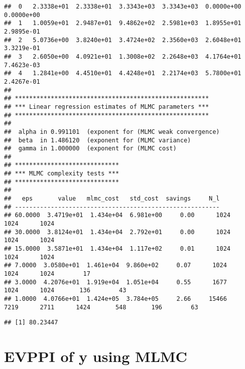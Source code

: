 \documentclass[
]{article}
\newenvironment{Shaded}{\begin{snugshade}}{\end{snugshade}}
\newcommand{\CommentTok}[1]{\textcolor[rgb]{0.56,0.35,0.01}{\textit{#1}}}
\newcommand{\DecValTok}[1]{\textcolor[rgb]{0.00,0.00,0.81}{#1}}
\newcommand{\KeywordTok}[1]{\textcolor[rgb]{0.13,0.29,0.53}{\textbf{#1}}}
\newcommand{\NormalTok}[1]{#1}
\newcommand{\OperatorTok}[1]{\textcolor[rgb]{0.81,0.36,0.00}{\textbf{#1}}}
\newcommand{\StringTok}[1]{\textcolor[rgb]{0.31,0.60,0.02}{#1}}
\begin{document}
\begin{verbatim}
##  0   2.3338e+01  2.3338e+01  3.3343e+03  3.3343e+03  0.0000e+00  0.0000e+00 
##  1   1.0059e+01  2.9487e+01  9.4862e+02  2.5981e+03  1.8955e+01  2.9895e-01 
##  2   5.0736e+00  3.8240e+01  3.4724e+02  2.3560e+03  2.6048e+01  3.3219e-01 
##  3   2.6050e+00  4.0921e+01  1.3008e+02  2.2648e+03  4.1764e+01  7.4623e-03 
##  4   1.2841e+00  4.4510e+01  4.4248e+01  2.2174e+03  5.7800e+01  2.4267e-01 
## 
## ******************************************************
## *** Linear regression estimates of MLMC parameters ***
## ******************************************************
## 
##  alpha in 0.991101  (exponent for (MLMC weak convergence)
##  beta  in 1.486120  (exponent for (MLMC variance) 
##  gamma in 1.000000  (exponent for (MLMC cost) 
## 
## ***************************** 
## *** MLMC complexity tests *** 
## ***************************** 
## 
##   eps       value   mlmc_cost   std_cost  savings     N_l 
## --------------------------------------------------------- 
## 60.0000  3.4719e+01  1.434e+04  6.981e+00     0.00      1024      1024      1024
## 30.0000  3.8124e+01  1.434e+04  2.792e+01     0.00      1024      1024      1024
## 15.0000  3.5871e+01  1.434e+04  1.117e+02     0.01      1024      1024      1024
## 7.0000  3.0580e+01  1.461e+04  9.860e+02     0.07      1024      1024      1024        17
## 3.0000  4.2076e+01  1.919e+04  1.051e+04     0.55      1677      1024      1024       136        43
## 1.0000  4.0766e+01  1.424e+05  3.784e+05     2.66     15466      7219      2711      1424       548       196        63
\end{verbatim}

\begin{Shaded}
\end{Shaded}

\begin{verbatim}
## [1] 80.23447
\end{verbatim}

\hypertarget{evppi-of-y-using-mlmc}{%
\section{EVPPI of y using MLMC}\label{evppi-of-y-using-mlmc}}
\end{document}
